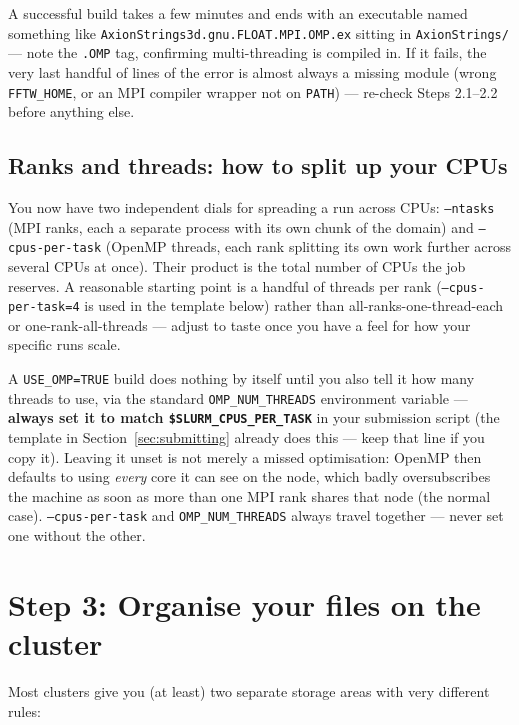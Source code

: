 \documentclass[11pt]{article}
\begin{document}
A successful build takes a few minutes and ends with an executable named something like
\texttt{AxionStrings3d.gnu.FLOAT.MPI.OMP.ex} sitting in \texttt{AxionStrings/} --- note the \texttt{.OMP}
tag, confirming multi-threading is compiled in. If it fails, the very last handful of lines of the error is
almost always a missing module (wrong \texttt{FFTW\_HOME}, or an MPI compiler wrapper not on \texttt{PATH})
--- re-check Steps 2.1--2.2 before anything else.

\subsection{Ranks and threads: how to split up your CPUs}
\label{sec:openmp}

You now have two independent dials for spreading a run across CPUs: \texttt{--ntasks} (MPI ranks, each a
separate process with its own chunk of the domain) and \texttt{--cpus-per-task} (OpenMP threads, each rank
splitting its own work further across several CPUs at once). Their product is the total number of CPUs the
job reserves. A reasonable starting point is a handful of threads per rank (\texttt{--cpus-per-task=4} is
used in the template below) rather than all-ranks-one-thread-each or one-rank-all-threads --- adjust to
taste once you have a feel for how your specific runs scale.

\begin{warn}
A \texttt{USE\_OMP=TRUE} build does nothing by itself until you also tell it how many threads to use, via
the standard \texttt{OMP\_NUM\_THREADS} environment variable --- \textbf{always set it to match
\texttt{\$SLURM\_CPUS\_PER\_TASK}} in your submission script (the template in Section~\ref{sec:submitting}
already does this --- keep that line if you copy it). Leaving it unset is not merely a missed optimisation:
OpenMP then defaults to using \emph{every} core it can see on the node, which badly oversubscribes the
machine as soon as more than one MPI rank shares that node (the normal case). \texttt{--cpus-per-task} and
\texttt{OMP\_NUM\_THREADS} always travel together --- never set one without the other.
\end{warn}

\section{Step 3: Organise your files on the cluster}
\label{sec:organise}

Most clusters give you (at least) two separate storage areas with very different rules:
\end{document}
